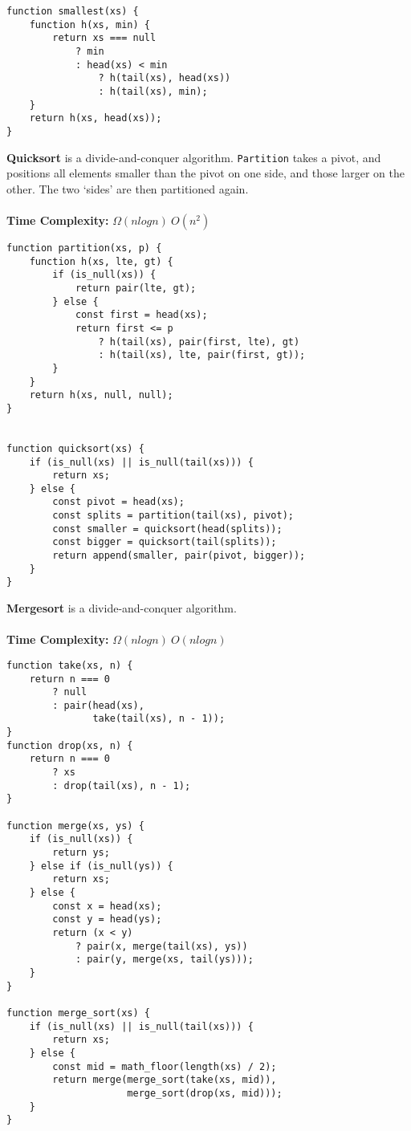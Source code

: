 \documentclass[a4paper]{article} \usepackage[backend=biber, style=numeric, sorting=none]{biblatex}
\begin{document}
\begin{multicols*}{4}
\begin{verbatim}
function smallest(xs) {
    function h(xs, min) {
        return xs === null
            ? min
            : head(xs) < min
                ? h(tail(xs), head(xs))
                : h(tail(xs), min);
    }
    return h(xs, head(xs));
}
\end{verbatim}
\vfill\null
\columnbreak
{\small\textbf{Quicksort}} is a divide-and-conquer algorithm. \texttt{Partition} takes a pivot, and positions all elements smaller than the pivot on one side, and those larger on the other. The two `sides' are then partitioned again.
\\ \\
\textbf{Time Complexity:} $\Omega(n log n)\ O(n^{2})$
\begin{verbatim}
function partition(xs, p) {
    function h(xs, lte, gt) {
        if (is_null(xs)) {
            return pair(lte, gt);
        } else {
            const first = head(xs);
            return first <= p
                ? h(tail(xs), pair(first, lte), gt)
                : h(tail(xs), lte, pair(first, gt));
        }
    }
    return h(xs, null, null);
}


function quicksort(xs) {
    if (is_null(xs) || is_null(tail(xs))) {
        return xs;
    } else {
        const pivot = head(xs);
        const splits = partition(tail(xs), pivot);
        const smaller = quicksort(head(splits));
        const bigger = quicksort(tail(splits));
        return append(smaller, pair(pivot, bigger));
    }
}
\end{verbatim}
\vfill\null
\columnbreak
{\small\textbf{Mergesort}} is a divide-and-conquer algorithm.
\\ \\
\textbf{Time Complexity:} $\Omega(n log n)\ O(n log n)$
\begin{verbatim}
function take(xs, n) {
    return n === 0
        ? null
        : pair(head(xs),
               take(tail(xs), n - 1));
}
function drop(xs, n) {
    return n === 0
        ? xs
        : drop(tail(xs), n - 1);
}

function merge(xs, ys) {
    if (is_null(xs)) { 
        return ys;
    } else if (is_null(ys)) { 
        return xs;
    } else {
        const x = head(xs);
        const y = head(ys);
        return (x < y) 
            ? pair(x, merge(tail(xs), ys))
            : pair(y, merge(xs, tail(ys)));
    }
}

function merge_sort(xs) {
    if (is_null(xs) || is_null(tail(xs))) {
        return xs;
    } else {
        const mid = math_floor(length(xs) / 2);  
        return merge(merge_sort(take(xs, mid)), 
                     merge_sort(drop(xs, mid)));
    }
}
\end{verbatim}

\end{multicols*}
\end{document}
